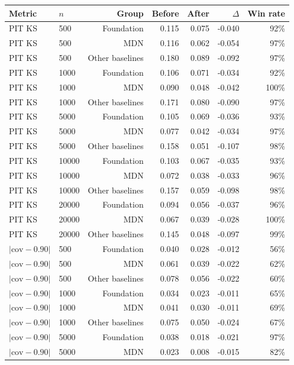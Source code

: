 \begin{tabular}{llrrrrr}
\toprule
Metric & $n$ & Group & Before & After & $\Delta$ & Win rate \\
\midrule
PIT KS & 500 & Foundation & 0.115 & 0.075 & -0.040 & 92\% \\
PIT KS & 500 & MDN & 0.116 & 0.062 & -0.054 & 97\% \\
PIT KS & 500 & Other baselines & 0.180 & 0.089 & -0.092 & 97\% \\
PIT KS & 1000 & Foundation & 0.106 & 0.071 & -0.034 & 92\% \\
PIT KS & 1000 & MDN & 0.090 & 0.048 & -0.042 & 100\% \\
PIT KS & 1000 & Other baselines & 0.171 & 0.080 & -0.090 & 97\% \\
PIT KS & 5000 & Foundation & 0.105 & 0.069 & -0.036 & 93\% \\
PIT KS & 5000 & MDN & 0.077 & 0.042 & -0.034 & 97\% \\
PIT KS & 5000 & Other baselines & 0.158 & 0.051 & -0.107 & 98\% \\
PIT KS & 10000 & Foundation & 0.103 & 0.067 & -0.035 & 93\% \\
PIT KS & 10000 & MDN & 0.072 & 0.038 & -0.033 & 96\% \\
PIT KS & 10000 & Other baselines & 0.157 & 0.059 & -0.098 & 98\% \\
PIT KS & 20000 & Foundation & 0.094 & 0.056 & -0.037 & 96\% \\
PIT KS & 20000 & MDN & 0.067 & 0.039 & -0.028 & 100\% \\
PIT KS & 20000 & Other baselines & 0.145 & 0.048 & -0.097 & 99\% \\
\midrule
$|\mathrm{cov}-0.90|$ & 500 & Foundation & 0.040 & 0.028 & -0.012 & 56\% \\
$|\mathrm{cov}-0.90|$ & 500 & MDN & 0.061 & 0.039 & -0.022 & 62\% \\
$|\mathrm{cov}-0.90|$ & 500 & Other baselines & 0.078 & 0.056 & -0.022 & 60\% \\
$|\mathrm{cov}-0.90|$ & 1000 & Foundation & 0.034 & 0.023 & -0.011 & 65\% \\
$|\mathrm{cov}-0.90|$ & 1000 & MDN & 0.041 & 0.030 & -0.011 & 69\% \\
$|\mathrm{cov}-0.90|$ & 1000 & Other baselines & 0.075 & 0.050 & -0.024 & 67\% \\
$|\mathrm{cov}-0.90|$ & 5000 & Foundation & 0.038 & 0.018 & -0.021 & 97\% \\
$|\mathrm{cov}-0.90|$ & 5000 & MDN & 0.023 & 0.008 & -0.015 & 82\% \\

\end{tabular}
